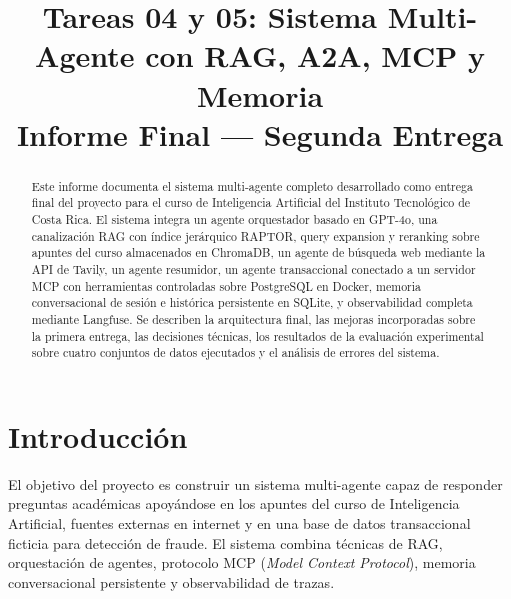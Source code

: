 \documentclass[conference]{IEEEtran}
\begin{document}
\title{Tareas 04 y 05: Sistema Multi-Agente con RAG, A2A, MCP y Memoria\\
{\large Informe Final --- Segunda Entrega}}

\author{
\and
{}
\and
{}
}

\maketitle

\begin{abstract}
Este informe documenta el sistema multi-agente completo desarrollado como entrega final del proyecto para el curso de Inteligencia Artificial del Instituto Tecnológico de Costa Rica. El sistema integra un agente orquestador basado en GPT-4o, una canalización RAG con índice jerárquico RAPTOR, query expansion y reranking sobre apuntes del curso almacenados en ChromaDB, un agente de búsqueda web mediante la API de Tavily, un agente resumidor, un agente transaccional conectado a un servidor MCP con herramientas controladas sobre PostgreSQL en Docker, memoria conversacional de sesión e histórica persistente en SQLite, y observabilidad completa mediante Langfuse. Se describen la arquitectura final, las mejoras incorporadas sobre la primera entrega, las decisiones técnicas, los resultados de la evaluación experimental sobre cuatro conjuntos de datos ejecutados y el análisis de errores del sistema.
\end{abstract}

\section{Introducción}

El objetivo del proyecto es construir un sistema multi-agente capaz de responder preguntas académicas apoyándose en los apuntes del curso de Inteligencia Artificial, fuentes externas en internet y en una base de datos transaccional ficticia para detección de fraude. El sistema combina técnicas de RAG, orquestación de agentes, protocolo MCP (\textit{Model Context Protocol}), memoria conversacional persistente y observabilidad de trazas.
\end{document}
